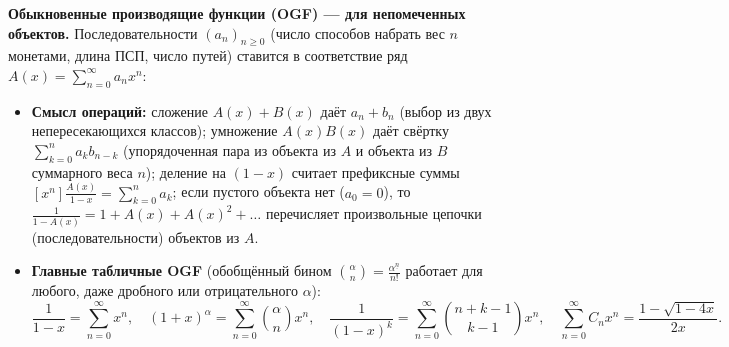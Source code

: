 \documentclass[10pt,a4paper]{article}
\renewcommand{\ge}{\geqslant}
\newcommand{\fall}[2]{#1^{\underline{#2}}}
\begin{document}
\textbf{Обыкновенные производящие функции (OGF) — для непомеченных объектов.} Последовательности $(a_n)_{n \ge 0}$ (число способов набрать вес $n$ монетами, длина ПСП, число путей) ставится в соответствие ряд $A(x) = \sum_{n=0}^\infty a_n x^n$:
\begin{itemize}
  \item \textbf{Смысл операций:} сложение $A(x) + B(x)$ даёт $a_n + b_n$ (выбор из двух непересекающихся классов); умножение $A(x) B(x)$ даёт свёртку $\sum_{k=0}^n a_k b_{n - k}$ (упорядоченная пара из объекта из $A$ и объекта из $B$ суммарного веса $n$); деление на $(1 - x)$ считает префиксные суммы $[x^n]\frac{A(x)}{1 - x} = \sum_{k=0}^n a_k$; если пустого объекта нет ($a_0 = 0$), то $\frac{1}{1 - A(x)} = 1 + A(x) + A(x)^2 + \dots$ перечисляет произвольные цепочки (последовательности) объектов из $A$.
  \item \textbf{Главные табличные OGF} (обобщённый бином $\binom{\alpha}{n} = \frac{\fall{\alpha}{n}}{n!}$ работает для любого, даже дробного или отрицательного $\alpha$):
  \[
    \frac{1}{1 - x} = \sum_{n=0}^{\infty} x^n, \quad
    (1 + x)^\alpha = \sum_{n=0}^{\infty} \binom{\alpha}{n} x^n, \quad
    \frac{1}{(1 - x)^k} = \sum_{n=0}^{\infty} \binom{n + k - 1}{k - 1} x^n, \quad
    \sum_{n=0}^{\infty} C_n x^n = \frac{1 - \sqrt{1 - 4x}}{2x}.
  \]
\end{itemize}
\end{document}
